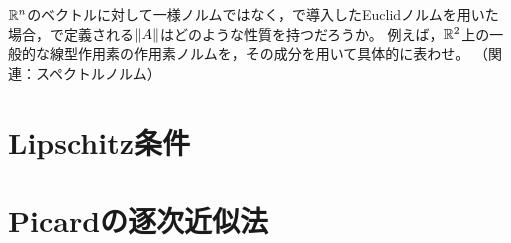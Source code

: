 \documentclass[b5paper,draft,oneside,openany]{ltjsbook} %
\begin{document}
\begin{prob}
    $\mathbb{R}^n$のベクトルに対して一様ノルムではなく，で導入したEuclidノルムを用いた場合，で定義される$\norm{A}$はどのような性質を持つだろうか。
    例えば，$\mathbb{R}^2$上の一般的な線型作用素の作用素ノルムを，その成分を用いて具体的に表わせ。
    （関連：スペクトルノルム）
\end{prob}


\section{Lipschitz条件}


\section{Picardの逐次近似法}
\end{document}
